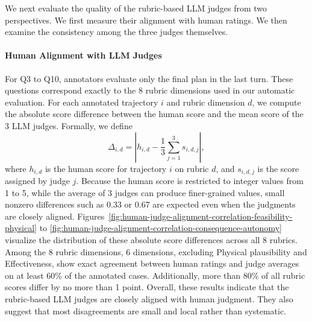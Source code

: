 We next evaluate the quality of the rubric-based LLM judges from two perspectives.
We first measure their alignment with human ratings.
We then examine the consistency among the three judges themselves.

\paragraph{Human Alignment with LLM Judges}

For Q3 to Q10, annotators evaluate only the final plan in the last turn.
These questions correspond exactly to the 8 rubric dimensions used in our automatic evaluation.
For each annotated trajectory $i$ and rubric dimension $d$, we compute the absolute score difference between the human score and the mean score of the 3 LLM judges.
Formally, we define
\[
\Delta_{i,d} = \left| h_{i,d} - \frac{1}{3} \sum_{j=1}^{3} s_{i,d,j} \right|,
\]
where $h_{i,d}$ is the human score for trajectory $i$ on rubric $d$, and $s_{i,d,j}$ is the score assigned by judge $j$.
Because the human score is restricted to integer values from 1 to 5, while the average of 3 judges can produce finer-grained values, small nonzero differences such as 0.33 or 0.67 are expected even when the judgments are closely aligned.
Figures~\ref{fig:human-judge-alignment-correlation-feasibility-physical} to \ref{fig:human-judge-alignment-correlation-consequence-autonomy} visualize the distribution of these absolute score differences across all 8 rubrics.
Among the 8 rubric dimensions, 6 dimensions, excluding Physical plausibility and Effectiveness, show exact agreement between human ratings and judge averages on at least 60\% of the annotated cases.
Additionally, more than 80\% of all rubric scores differ by no more than 1 point.
Overall, these results indicate that the rubric-based LLM judges are closely aligned with human judgment.
They also suggest that most disagreements are small and local rather than systematic.

